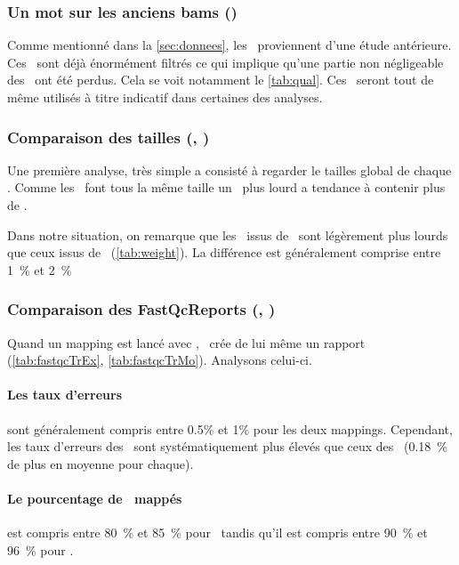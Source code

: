 \documentclass[../main]{subfiles} %
\begin{document}
\subsubsection{Un mot sur les anciens bams (\OldBam)}
\label{sec:oldBam}
Comme mentionné dans la \cref{sec:donnees}, les \OldBam proviennent d'une étude antérieure. Ces \bam sont déjà énormément filtrés ce qui implique qu'une partie non négligeable des \reads ont été perdus. Cela se voit notamment le \cref{tab:qual}. Ces \bam seront tout de même utilisés à titre indicatif dans certaines des analyses.



\subsubsection{Comparaison des tailles (\BamTrEx, \BamTrMo)}
Une première analyse, très simple a consisté à regarder le tailles global de chaque \bam. Comme les \reads font tous la même taille un \bam plus lourd a tendance à contenir plus de \reads.






Dans notre situation, on remarque que les \bam issus de \TrMo sont légèrement plus lourds que ceux issus de \TrEx (\cref{tab:weight}). La différence est généralement comprise entre 1 \% et 2 \%


\subsubsection{Comparaison des FastQcReports (\BamTrEx, \BamTrMo)}
\label{sec:fastqc}
Quand un \gls{mapping} est lancé avec \GeCKO, \GeCKO crée de lui même un rapport \fastqc (\cref{tab:fastqcTrEx}, \cref{tab:fastqcTrMo}). Analysons celui-ci.







\paragraph{Les taux d'erreurs} sont généralement compris entre 0.5\% et 1\% pour les deux \glspl{mapping}. Cependant, les taux d'erreurs des \BamTrMo sont systématiquement plus élevés que ceux des \BamTrEx (0.18 \% de plus en moyenne pour chaque). 

\paragraph{Le pourcentage de \reads mappés} est compris entre 80 \% et 85 \% pour \TrMo tandis qu'il est compris entre 90 \% et 96 \% pour \TrEx.
\end{document}
